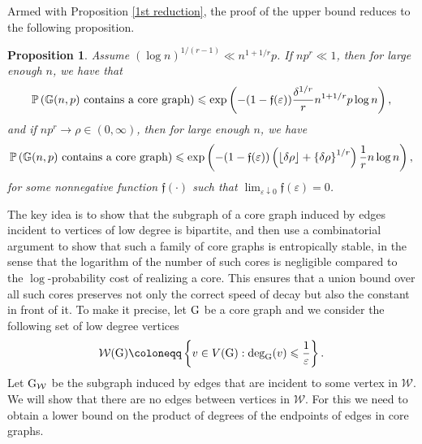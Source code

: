 \documentclass[a4paper,11pt,english,reqno]{amsart}
\numberwithin{equation}{section}
\renewcommand{\leq}{\leqslant}
\newcommand{\W}{\mathcal{W}}
\renewcommand{\P}{\mathbb{P}}
\newcommand{\G}{\mathbb{G}}
\newcommand{\tu}[1]{\textup{#1}}
\newtheorem{proposition}[theorem]{Proposition}
\begin{document}
			Armed with Proposition \ref{1st reduction}, the proof of the upper bound reduces to the following proposition.
			\begin{proposition}
				\label{main proposition}
				Assume $(\log n)^{1/(r-1)}\ll n^{1+1/r}p$. If $np^{r}\ll 1$, then for large enough $n$, we have that
				\begin{equation*}
					\P\left(\G(n,p)\textup{ contains a core graph}\right)\leq \exp\left(-(1-\mathfrak{f}(\varepsilon))\frac{\delta^{1/r}}{r}n^{1+1/r}p\log n\right),
				\end{equation*}
				and if $np^{r}\rightarrow \rho\in (0,\infty)$, then for large enough $n$, we have
				\begin{equation}\label{eq:p-sim-bdry}
					\P\left(\G(n,p)\textup{ contains a core graph}\right) \leq \exp\left(-(1-\mathfrak{f}(\varepsilon))\left(\lfloor \delta \rho\rfloor+\left\{\delta \rho\right\}^{1/r}\right)\frac{1}{r}n\log n\right),
				\end{equation}
				for some nonnegative function $\mathfrak{f}(\cdot)$ such that $\lim_{\varepsilon\downarrow 0}\mathfrak{f}(\varepsilon)=0$.
			\end{proposition}
			The key idea is to show that the subgraph of a core graph induced by edges incident to vertices of low degree is bipartite, and then use a combinatorial argument to show that such a family of core graphs is entropically stable, in the sense that the logarithm of the number of such cores is negligible compared to the $\log$-probability cost of realizing a core. This ensures that a union bound over all such cores preserves not only the correct speed of decay but also the constant in front of it.
			To make it precise, let $\tu{G}$ be a core graph and we consider the following set of low degree vertices
			\begin{equation*}
				\W(\tu{G}) \coloneqq \left\{v\in V(\tu{G}):\text{deg}_{\tu{G}}(v)\leq \frac{1}{\varepsilon}\right\}.
			\end{equation*}
			Let $\tu{G}_{\W}$ be the subgraph induced by edges that are incident to some vertex in $\W$. We will show that there are no edges between vertices in $\W$. For this we need to obtain a lower bound on the product of degrees of the endpoints of edges in core graphs.
			
			
			
			
			
			
			
			
			
			
			
			
			
\end{document}
